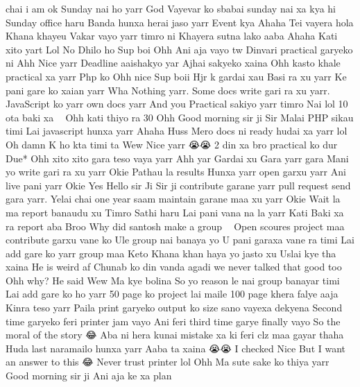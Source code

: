 chai i am ok Sunday nai ho yarr God Vayevar ko sbabai sunday nai xa kya hi Sunday office haru Banda hunxa herai jaso yarr Event kya Ahaha Tei vayera hola Khana khayeu Vakar vayo yarr timro ni Khayera sutna lako aaba Ahaha Kati xito yart Lol No Dhilo ho Sup boi Ohh Ani aja vayo tw Dinvari practical garyeko ni Ahh Nice yarr Deadline aaishakyo yar Ajhai sakyeko xaina Ohh kasto khale practical xa yarr Php ko Ohh nice Sup boii Hjr k gardai xau Basi ra xu yarr Ke pani gare ko xaian yarr Wha Nothing yarr. Some docs write gari ra xu yarr. JavaScript ko yarr own docs yarr And you Practical sakiyo yarr timro Nai lol 10 ota baki xa 🥹🥹 Ohh kati thiyo ra 30 Ohh Good morning sir ji Sir Malai PHP sikau timi Lai javascript hunxa yarr Ahaha Huss Mero docs ni ready hudai xa yarr lol Oh damn K ho kta timi ta Wew Nice yarr 😭😭 2 din xa bro practical ko dur Due* Ohh xito xito gara teso vaya yarr Ahh yar Gardai xu Gara yarr gara Mani yo write gari ra xu yarr Okie Pathau la results Hunxa yarr open garxu yarr Ani live pani yarr Okie Yes Hello sir Ji Sir ji contribute garane yarr pull request send gara yarr. Yelai chai one year saam maintain garane maa xu yarr Okie Wait la ma report banaudu xu Timro Sathi haru Lai pani vana na la yarr Kati Baki xa ra report aba Broo Why did santosh make a group 🥹🥹 Open scoures project maa contribute garxu vane ko Ule group nai banaya yo U pani garaxa vane ra timi Lai add gare ko yarr group maa Keto Khana khan haya yo jasto xu Uslai kye tha xaina He is weird af Chunab ko din vanda agadi we never talked that good too Ohh why? He said Wew Ma kye bolina So yo reason le nai group banayar timi Lai add gare ko ho yarr 50 page ko project lai maile 100 page khera falye aaja 🥹🥹 Kinra teso yarr Paila print garyeko output ko size sano vayexa dekyena Second time garyeko feri printer jam vayo Ani feri third time garye finally vayo So the moral of the story 😂 Aba ni hera kunai mistake xa ki feri clz maa gayar thaha Huda last naramailo hunxa yarr Aaba ta xaina 😭😭 I checked Nice But I want an answer to this 😂 Never trust printer lol Ohh Ma sute sake ko thiya yarr Good morning sir ji Ani aja ke xa plan

